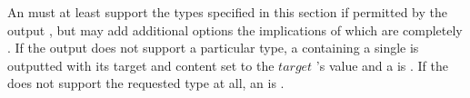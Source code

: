 An  must at least support the types specified in this section if permitted by the output , but may add additional options the implications of which are completely . If the output  does not support a particular type, a  containing a single   is outputted with its target and content set to the \inline$target$ 's value and a  is . If the  does not support the requested type at all, an  is . \\






